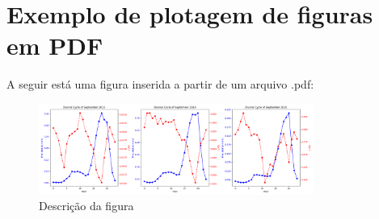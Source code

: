 \documentclass{article}
\begin{document}
\section*{Exemplo de plotagem de figuras em PDF}

A seguir está uma figura inserida a partir de um arquivo .pdf:

\begin{figure}[h]
    \centering
    \includegraphics[width=0.8\textwidth]{september_2013_september_2014_september_2015_panel.png}
    \caption{Descrição da figura}
    \label{fig:exemplo}
\end{figure}
\end{document}
